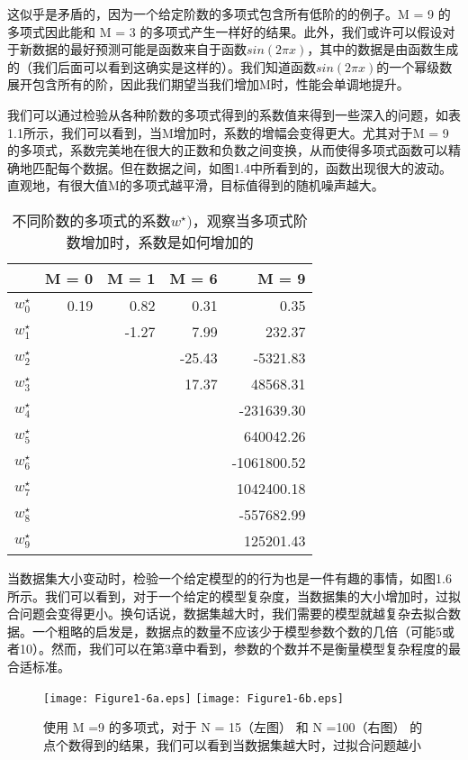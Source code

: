 	这似乎是矛盾的，因为一个给定阶数的多项式包含所有低阶的的例子。M = 9 的多项式因此能和 M = 3 的多项式产生一样好的结果。此外，我们或许可以假设对于新数据的最好预测可能是函数来自于函数$sin(2 \pi x)$，其中的数据是由函数生成的（我们后面可以看到这确实是这样的）。我们知道函数$sin(2 \pi x)$的一个幂级数展开包含所有的阶，因此我们期望当我们增加M时，性能会单调地提升。
	
	我们可以通过检验从各种阶数的多项式得到的系数值来得到一些深入的问题，如表1.1所示，我们可以看到，当M增加时，系数的增幅会变得更大。尤其对于M = 9 的多项式，系数完美地在很大的正数和负数之间变换，从而使得多项式函数可以精确地匹配每个数据。但在数据之间，如图1.4中所看到的，函数出现很大的波动。直观地，有很大值M的多项式越平滑，目标值得到的随机噪声越大。
	
	\begin{table}[b]
		\parbox{.3\textwidth}{\caption{不同阶数的多项式的系数$w^{\star})$，观察当多项式阶数增加时，系数是如何增加的}}
		\parbox{.5\textwidth}{
		\begin{tabular}{r|rrrr}
			& M = 0 & M = 1 & M = 6 & M = 9\\
			\hline
			$w_0^{\star}$ & 0.19 & 0.82 & 0.31 & 0.35 \\
			$w_1^{\star}$ &      & -1.27 & 7.99 & 232.37 \\
			$w_2^{\star}$ &      &       & -25.43 & -5321.83 \\
			$w_3^{\star}$ &  	 & 		 & 17.37 & 48568.31 \\
			$w_4^{\star}$ & 	 & 		 &  	 & -231639.30 \\
			$w_5^{\star}$ & 	 &  	 & 		& 640042.26 \\
			$w_6^{\star}$ & 	 &  	 &  	& -1061800.52 \\
			$w_7^{\star}$ &  	 &  	 &  	& 1042400.18 \\
			$w_8^{\star}$ &  	 &  	 & 		& -557682.99 \\
			$w_9^{\star}$ &  	 & 		 &		&  125201.43
			
		\end{tabular}
	}
	\end{table}
	
	当数据集大小变动时，检验一个给定模型的的行为也是一件有趣的事情，如图1.6所示。我们可以看到，对于一个给定的模型复杂度，当数据集的大小增加时，过拟合问题会变得更小。换句话说，数据集越大时，我们需要的模型就越复杂去拟合数据。一个粗略的启发是，数据点的数量不应该少于模型参数个数的几倍（可能5或者10）。然而，我们可以在第3章中看到，参数的个数并不是衡量模型复杂程度的最合适标准。
	
	\begin{figure}
		
		\texttt{[image: Figure1-6a.eps]}
		\texttt{[image: Figure1-6b.eps]}

		\caption{使用 M =9 的多项式，对于 N = 15（左图） 和 N =100（右图） 的点个数得到的结果，我们可以看到当数据集越大时，过拟合问题越小} 
		\label{fig:endb-flow} 
	\end{figure}
	
